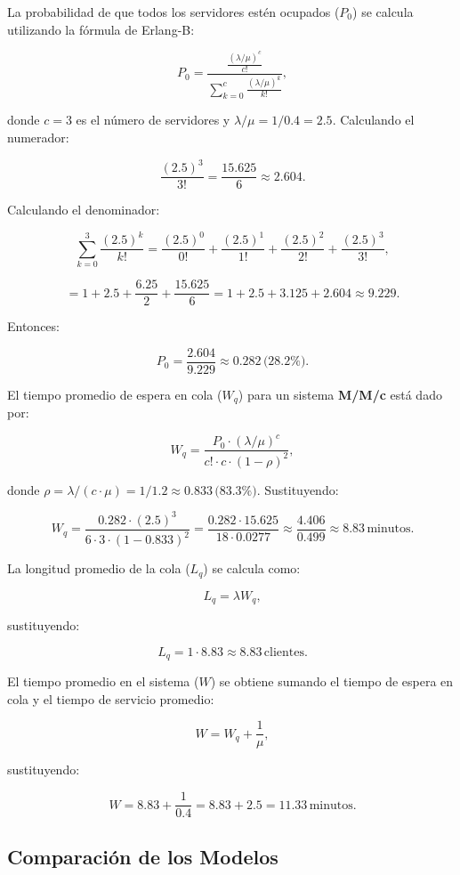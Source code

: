 \documentclass[a4paper,12pt]{article}
\begin{document}
La probabilidad de que todos los servidores estén ocupados (\( P_0 \)) se calcula utilizando la fórmula de Erlang-B:

\[\
P_0 = \frac{\frac{(\lambda / \mu)^c}{c!}}{\sum_{k=0}^{c} \frac{(\lambda / \mu)^k}{k!}},
\]

donde \( c = 3 \) es el número de servidores y \( \lambda / \mu = 1 / 0.4 = 2.5 \). Calculando el numerador:

\[\
\frac{(2.5)^3}{3!} = \frac{15.625}{6} \approx 2.604.
\]

Calculando el denominador:

\[\
\sum_{k=0}^{3} \frac{(2.5)^k}{k!} = \frac{(2.5)^0}{0!} + \frac{(2.5)^1}{1!} + \frac{(2.5)^2}{2!} + \frac{(2.5)^3}{3!},
\]

\[\
= 1 + 2.5 + \frac{6.25}{2} + \frac{15.625}{6} = 1 + 2.5 + 3.125 + 2.604 \approx 9.229.
\]

Entonces:

\[\
P_0 = \frac{2.604}{9.229} \approx 0.282 \, \text{(28.2\%)}.
\]

El tiempo promedio de espera en cola (\( W_q \)) para un sistema \textbf{M/M/c} está dado por:

\[\
W_q = \frac{P_0 \cdot (\lambda / \mu)^c}{c! \cdot c \cdot (1 - \rho)^2},
\]

donde \( \rho = \lambda / (c \cdot \mu) = 1 / 1.2 \approx 0.833 \, \text{(83.3\%)}. \) Sustituyendo:

\[\
W_q = \frac{0.282 \cdot (2.5)^3}{6 \cdot 3 \cdot (1 - 0.833)^2} = \frac{0.282 \cdot 15.625}{18 \cdot 0.0277} \approx \frac{4.406}{0.499} \approx 8.83 \, \text{minutos}.
\]

La longitud promedio de la cola (\( L_q \)) se calcula como:

\[\
L_q = \lambda W_q,
\]

sustituyendo:

\[\
L_q = 1 \cdot 8.83 \approx 8.83 \, \text{clientes}.
\]

El tiempo promedio en el sistema (\( W \)) se obtiene sumando el tiempo de espera en cola y el tiempo de servicio promedio:

\[\
W = W_q + \frac{1}{\mu},
\]

sustituyendo:

\[\
W = 8.83 + \frac{1}{0.4} = 8.83 + 2.5 = 11.33 \, \text{minutos}.
\]

\subsection{Comparación de los Modelos}
\end{document}
